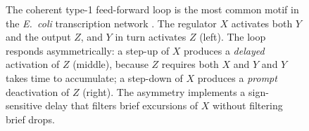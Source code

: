 \begin{figure}[htbp]
\begin{tikzpicture}
\end{tikzpicture}
\caption[Coherent type-1 feed-forward loop]{The coherent type-1
feed-forward loop is the most common motif in the \emph{E.\ coli}
transcription network \cite{paper:v6c01-shoval-alon-2010}. The
regulator $X$ activates both $Y$ and the output $Z$, and $Y$ in turn
activates $Z$ (left). The loop responds asymmetrically: a step-up of
$X$ produces a \emph{delayed} activation of $Z$ (middle), because
$Z$ requires both $X$ and $Y$ and $Y$ takes time to accumulate; a
step-down of $X$ produces a \emph{prompt} deactivation of $Z$ (right).
The asymmetry implements a sign-sensitive delay that filters brief
excursions of $X$ without filtering brief drops.}
\label{fig:vol06:ch01:feedforward-loop}
\end{figure}
